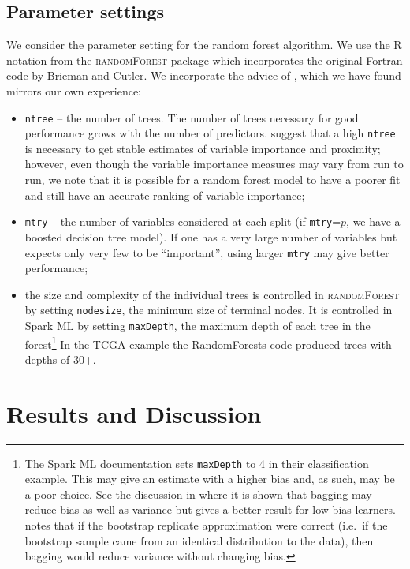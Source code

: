 \documentclass[10pt,letterpaper]{article}
\newcommand{\randomforest}{\textsc{randomForest}\xspace}
\newcommand{\mtry}{\texttt{mtry}\xspace}
\newcommand{\ntree}{\texttt{ntree}\xspace}
\begin{document}
\subsection{Parameter settings}
We consider the parameter setting for the random forest algorithm. We use the R notation from the \randomforest
package \cite{Liaw.and.Weiner.2002} which incorporates the original Fortran code by Brieman and Cutler.  We incorporate
the advice of \cite{Liaw.and.Weiner.2002}, which we have found mirrors our own experience:
\begin{itemize}
\item \ntree{}  -- the number of trees.  The number of trees necessary for good performance grows with the number of
  predictors.  \cite{Liaw.and.Weiner.2002} suggest that a high \ntree is necessary to get stable estimates of variable
  importance and proximity; however, even though the variable importance measures may vary from run to run, we note that
  it is possible for a random forest model to have a poorer fit and still have an accurate ranking of variable
  importance;
\item \mtry{}  -- the number of variables considered at each split (if \mtry=$p$, we have a boosted decision
  tree model).  If one has a very large number of variables but expects only very few to be ``important'', using larger \mtry may give
  better performance;
\item the size and complexity of the individual trees is controlled in \randomforest by setting \texttt{nodesize}, the
  minimum size of terminal nodes. It is controlled in Spark ML by setting \texttt{maxDepth}, the maximum depth of each
  tree in the forest\footnote{The Spark ML documentation \cite{Spark.2016} sets \texttt{maxDepth} to 4 in their
    classification example. This may give an estimate with a higher bias and, as such, may be a poor choice. See the
    discussion in \cite{Dietterich.2002} where it is shown that bagging may reduce bias as well as variance but gives a
    better result for low bias learners. \cite{Dietterich.2002} notes that if the bootstrap replicate approximation were
    correct (i.e.~if the bootstrap sample came from an identical distribution to the data), then bagging would reduce
    variance without changing bias.} In the TCGA example the RandomForests code produced trees with depths of 30+.
\end{itemize}



%
%
\section{Results and Discussion}
\end{document}
